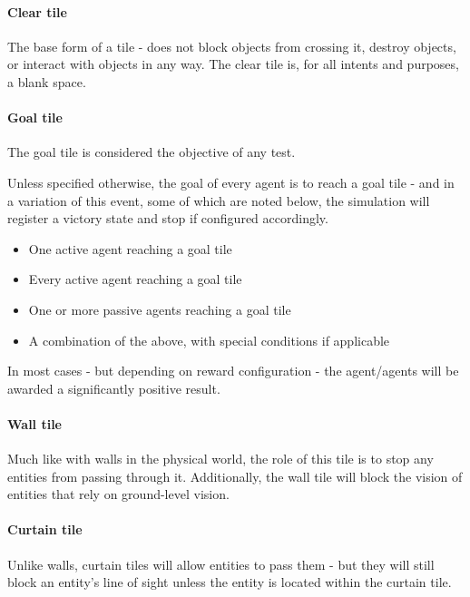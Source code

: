 \documentclass[masterthesis]{fer}
\begin{document}
\paragraph{Clear tile}

The base form of a tile - does not block objects from crossing it, destroy objects, or interact with objects in any way. The clear tile is, for all intents and purposes, a blank space.

\paragraph{Goal tile}
The goal tile is considered the objective of any test.

Unless specified otherwise, the goal of every agent is to reach a goal tile - and in a variation of this event, some of which are noted below, the simulation will register a victory state and stop if configured accordingly.
\begin{itemize}
\item One active agent reaching a goal tile
\item Every active agent reaching a goal tile
\item One or more passive agents reaching a goal tile
\item A combination of the above, with special conditions if applicable
\end{itemize}
 In most cases - but depending on reward configuration - the agent/agents will be awarded a significantly positive result.

\paragraph{Wall tile}
Much like with walls in the physical world, the role of this tile is to stop any entities from passing through it. Additionally, the wall tile will block the vision of entities that rely on ground-level vision.

\paragraph{Curtain tile}
Unlike walls, curtain tiles will allow entities to pass them - but they will still block an entity's line of sight unless the entity is located within the curtain tile.
\end{document}
